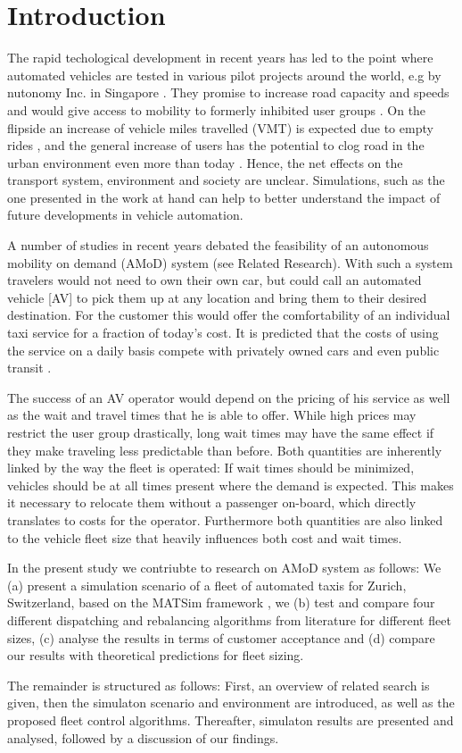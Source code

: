 \section{Introduction}

The rapid techological development in recent years has led to the point where
automated vehicles are tested in various pilot projects around the world, e.g by
nutonomy Inc. in Singapore \citep{ackerman2017hail}. They promise to increase road
capacity and speeds \citep{Tientrakool2011,Friedrich2015} and would give access to mobility to formerly
inhibited user groups \citep{Truong2017}. On the flipside an increase of vehicle
miles travelled (VMT) is expected due to empty rides \citep{Litman2014}, and the general increase
of users has the potential to clog road in the urban environment even more than today \citep{Meyer2017}.
Hence, the net effects on
the transport system, environment and society are unclear. Simulations, such as
the one presented in the work at hand can help to better understand the impact
of future developments in vehicle automation.

A number of studies in recent years debated the feasibility of an autonomous
mobility on demand (AMoD) system (see Related Research). With such a system travelers
would not need to own their own car, but could call an automated vehicle [AV] to pick
them up at any location and bring them to their desired destination. For the customer
this would offer the comfortability of an individual taxi service
for a fraction of today's cost. It is predicted that the costs of using the
service on a daily basis compete with privately owned cars and even
public transit \citep{Bosch2016a}.

The success of an AV operator would depend on the pricing of his service
as well as the wait and travel times that he is able to offer. While high prices
may restrict the user group drastically, long wait times may have the same effect
if they make traveling less predictable than before. Both quantities are inherently
linked by the way the fleet is operated: If wait times should be minimized, vehicles
should be at all times present where the demand is expected. This makes it necessary to
relocate them without a passenger on-board, which directly translates to costs for
the operator. Furthermore both quantities are also linked to the vehicle fleet
size that heavily influences both cost and wait times.

In the present study we contriubte to research on AMoD system as follows: We
(a) present a simulation scenario of a fleet of automated taxis for Zurich, Switzerland,
based on the MATSim framework \citep{Horni2015}, we (b) test and compare four different dispatching
and rebalancing algorithms from literature for different fleet sizes, (c) analyse the results
in terms of customer acceptance and (d) compare our results with theoretical
predictions for fleet sizing.

The remainder is structured as follows: First, an overview of related search is
given, then the simulaton scenario and environment are introduced, as well as the
proposed fleet control algorithms. Thereafter, simulaton results are presented and
analysed, followed by a discussion of our findings.
